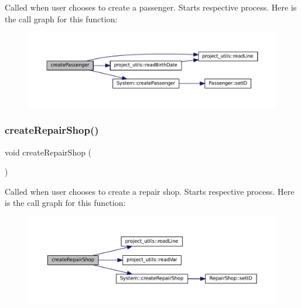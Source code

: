 Called when user chooses to create a passenger. Starts respective process. Here is the call graph for this function\+:
\nopagebreak
\begin{figure}[H]
\begin{center}
\leavevmode
\includegraphics[width=350pt]{Train-System_8cpp_ab7588618ce8693be3c5cbfdd2e5d9f41_cgraph}
\end{center}
\end{figure}
\mbox{\label{Train-System_8cpp_ac0c7ddc1730569b15adbd4ebeab84bc1}} 
\subsubsection{\texorpdfstring{create\+Repair\+Shop()}{createRepairShop()}}
{\footnotesize\ttfamily void create\+Repair\+Shop (\begin{DoxyParamCaption}{ }\end{DoxyParamCaption})}

Called when user chooses to create a repair shop. Starts respective process. Here is the call graph for this function\+:
\nopagebreak
\begin{figure}[H]
\begin{center}
\leavevmode
\includegraphics[width=350pt]{Train-System_8cpp_ac0c7ddc1730569b15adbd4ebeab84bc1_cgraph}
\end{center}
\end{figure}
\mbox{\label{Train-System_8cpp_a06aa6dbae847b41673895645c4c4585a}} 
